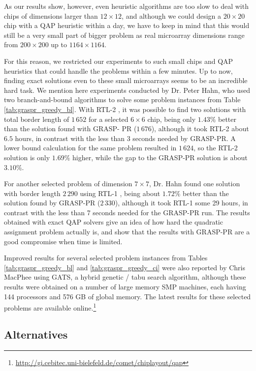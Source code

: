 As our results show, however, even heuristic algorithms are too slow to deal
with chips of dimensions larger than $12 \times 12$, and although we could
design a $20 \times 20$ chip with a QAP heuristic within a day, we have to keep
in mind that this would still be a very small part of bigger problem as real
microarray dimensions range from $200 \times 200$ up to $1164 \times 1164$.

For this reason, we restricted our experiments to such small chips and QAP
heuristics that could handle the problems within a few minutes. Up to now,
finding exact solutions even to these small microarrays seems to be an
incredible hard task. We mention here experiments conducted by Dr. Peter Hahn,
who used two branch-and-bound algorithms to solve some problem instances from
Table \ref{tab:graspr_greedy_bl}. With RTL-2 \citep{Adams}, it was possible to
find two solutions with total border length of $1\,652$ for a selected
$6\times 6$ chip, being only $1.43\%$ better than the solution found with GRASP-
PR ($1\,676$), although it took RTL-2 about $6.5$ hours, in contrast with the
less than 3 seconds needed by GRASP-PR. A lower bound calculation for the same
problem resulted in $1\,624$, so the RTL-2 solution is only $1.69\%$ higher,
while the gap to the GRASP-PR solution is about $3.10\%$.

For another selected problem of dimension $7\times 7$, Dr. Hahn found one
solution with border length $2\,290$ using RTL-1 \citep{Hahn1998}, being about
$1.72\%$ better than the solution found by GRASP-PR ($2\,330$), although it took
RTL-1 some 29 hours, in contrast with the less than 7 seconds needed for the
GRASP-PR run. The results obtained with exact QAP solvers give an idea of how
hard the quadratic assignment problem actually is, and show that the results
with GRASP-PR are a good compromise when time is limited.

Improved results for several selected problem instances from Tables
\ref{tab:graspr_greedy_bl} and \ref{tab:graspr_greedy_ci} were also reported by
Chris MacPhee using GATS, a hybrid genetic / tabu search algorithm, although
these results were obtained on a number of large memory SMP machines, each
having 144 processors and 576 GB of global memory. The latest results for these
selected problems are available
online.\footnote{\url{http://gi.cebitec.uni-bielefeld.de/comet/chiplayout/qap}}

\subsection{Alternatives}

